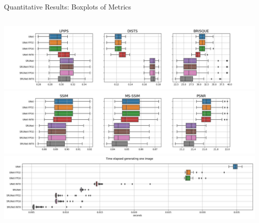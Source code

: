 \documentclass{beamer}
\begin{document}
\begin{frame}{Quantitative Results: Boxplots of Metrics}
\begin{columns}
\includegraphics[width=\textwidth]{../thesis/static/boxplots_perceptual_metrics.jpg}
\includegraphics[width=\textwidth]{../thesis/static/boxplots_traditional_metrics.jpg}
\includegraphics[width=\textwidth]{../thesis/static/boxplots_timings.jpg}
\end{columns}
\end{frame}

\end{document}
